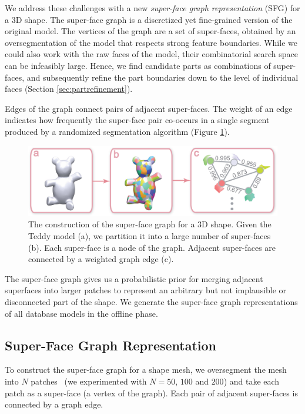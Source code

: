 We address these challenges with a new \emph{super-face graph representation} (SFG) for a 3D shape. The super-face graph is a discretized yet fine-grained version of the original model. The vertices of the graph are a set of super-faces, obtained by an oversegmentation of the model that respects strong feature boundaries. While we could also work with the raw faces of the model, their combinatorial search space can be infeasibly large. Hence, we find candidate parts as combinations of super-faces, and subsequently refine the part boundaries down to the level of individual faces (Section \ref{sec:partrefinement}).

Edges of the graph connect pairs of adjacent super-faces. The weight of an edge indicates how frequently the super-face pair co-occurs in a single segment produced by a randomized segmentation algorithm (Figure \ref{fig:SFG}).

\begin{figure}\centering
\includegraphics[width=\linewidth]{./Material/SFG.pdf}
\caption{The construction of the super-face graph for a 3D shape. Given the Teddy model (a), we partition it into a large number of super-faces (b). Each super-face is a node of the graph. Adjacent super-faces are connected by a weighted graph edge (c).}\label{fig:SFG}
\end{figure}

The super-face graph gives us a probabilistic prior for merging adjacent superfaces into larger patches to represent an arbitrary but not implausible or disconnected part of the shape. We generate the super-face graph representations of all database models in the offline phase.

\subsection{Super-Face Graph Representation}\label{subsec:sfg}

To construct the super-face graph for a shape mesh, we oversegment the mesh into $N$ patches~\cite{jointshapesegmentationhuangqixingsg2011} (we experimented with $N = 50$, $100$ and $200$) and take each patch as a super-face (a vertex of the graph). Each pair of adjacent super-faces is connected by a graph edge.

